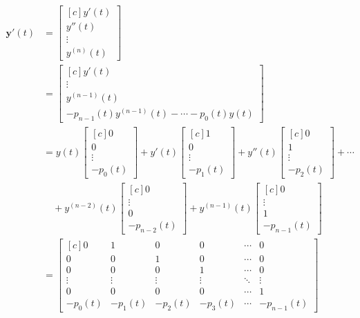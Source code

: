 \documentclass{myart}
\renewcommand{\vec}[1]{\mathbf{#1}}
\newcommand{\mat}[2][r]{\begin{bmatrix*}[#1] #2 \end{bmatrix*}}
\begin{document}
\begin{align*}
     \vec y'(t)
  &= \mat[c]{
       y' (t)     \\
       y''(t)     \\
       \vdots     \\
       y^{(n)}(t)
     } \\
  &= \mat[c]{
       y'(t)                                          \\
       \vdots                                         \\
       y^{(n-1)}(t)                                   \\
       -p_{n-1}(t) y^{(n-1)}(t) - \cdots - p_0(t)y(t)
     } \\
  &= y(t) \mat[c]{
       0       \\
       0       \\
       \vdots  \\
       -p_0(t)
     }
   + y'(t) \mat[c]{
       1       \\
       0       \\
       \vdots  \\
       -p_1(t)
     }
   + y''(t) \mat[c]{
      0       \\
      1       \\
      \vdots  \\
      -p_2(t)
     }
   + \cdots \\
  &\quad
   + y^{(n-2)}(t) \mat[c]{
       0           \\
       \vdots      \\
       0           \\
       -p_{n-2}(t)
     }
   + y^{(n-1)}(t) \mat[c]{
       0          \\
       \vdots     \\
       1          \\
       -p_{n-1}(t)
     } \\
  &= \mat[c]{
        0      &  1      &  0      &  0      & \cdots &  0          \\
        0      &  0      &  1      &  0      & \cdots &  0          \\
        0      &  0      &  0      &  1      & \cdots &  0          \\
        \vdots &  \vdots &  \vdots &  \vdots & \ddots &  \vdots     \\
        0      &  0      &  0      &  0      & \cdots &  1          \\
       -p_0(t) & -p_1(t) & -p_2(t) & -p_3(t) & \cdots & -p_{n-1}(t)
}
\end{align*}
\end{document}
